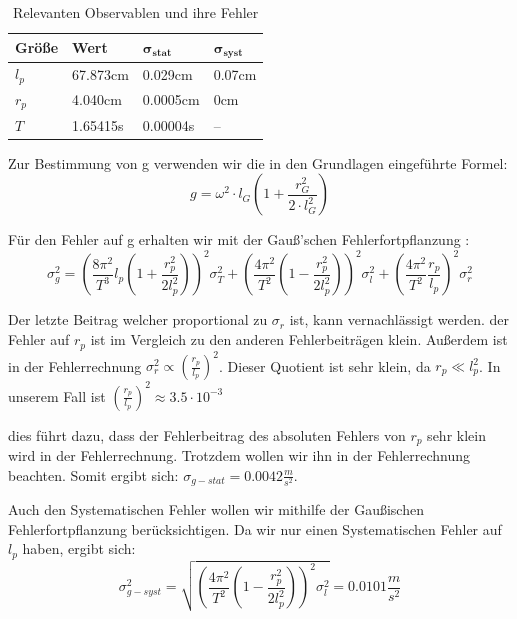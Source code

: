 \documentclass[twoside]{protokoll}
\begin{document}
\begin{table}[H]
        \centering
        \begin{tabularx}{1.0\textwidth}{X X X X} %
            \toprule
            \textbf{Größe} & \textbf{Wert} & $\mathbf{\sigma_{stat}}$ & $\mathbf{\sigma_{syst}}$ \\
            \midrule
            $l_p$ & 67.873cm & 0.029cm & 0.07cm \\
            $r_p$ & 4.040cm & 0.0005cm & 0cm\\
            $T$ & 1.65415s & 0.00004s & --\\
            \bottomrule
        \end{tabularx}
        \caption{Relevanten Observablen und ihre Fehler}
        \label{tab:längen un fehler}
    \end{table}
    
 Zur Bestimmung von g verwenden wir die in den Grundlagen eingeführte Formel:
\begin{equation}
    g = \omega^2 \cdot l_G \left( 1 + \frac{r_G^2}{2 \cdot l_G^2} \right)
    \label{eq:pendel_g}
\end{equation}

Für den Fehler auf g erhalten wir mit der Gauß'schen Fehlerfortpflanzung :
\begin{equation}
\sigma_g^2 = \left(\frac{8\pi^2}{T^3}l_p\left(1+\frac{r_p^2}{2l_p^2}\right)\right)^2 \sigma_T^2 + \left(\frac{4\pi^2}{T^2}\left(1-\frac{r_p^2}{2l_p^2}\right)\right)^2\sigma_l^2 + \left(\frac{4\pi^2}{T^2}\frac{r_p}{l_p}\right)^2\sigma_r^2 
\end{equation}

Der letzte Beitrag welcher proportional zu $\sigma_r$ ist, kann vernachlässigt werden. 
der Fehler auf $r_p$ ist im Vergleich zu den anderen Fehlerbeiträgen klein. 
Außerdem ist in der Fehlerrechnung $\sigma_r^2 \propto \left(\frac{r_p}{l_p}\right)^2$.
Dieser Quotient ist sehr klein, da $ r_p \ll l_p^2 $. 
In unserem Fall ist $\left(\frac{r_p}{l_p}\right)^2 \approx 3.5\cdot10^{-3} $

dies führt dazu, dass der Fehlerbeitrag des absoluten Fehlers von $r_p$ sehr klein wird in der Fehlerrechnung.
Trotzdem wollen wir ihn in der Fehlerrechnung beachten. Somit ergibt sich: $\sigma_{g-stat} = 0.0042 \frac{m}{s^2}$.

Auch den Systematischen Fehler wollen wir mithilfe der Gaußischen Fehlerfortpflanzung berücksichtigen.
Da wir nur einen Systematischen Fehler auf $l_p$ haben, ergibt sich:
\begin{equation}
    \sigma_{g-syst}^2 =  \sqrt{\left(\frac{4\pi^2}{T^2}\left(1-\frac{r_p^2}{2l_p^2}\right)\right)^2\sigma_l^2} = 0.0101 \frac{m}{s^2}
\end{equation}
\end{document}
